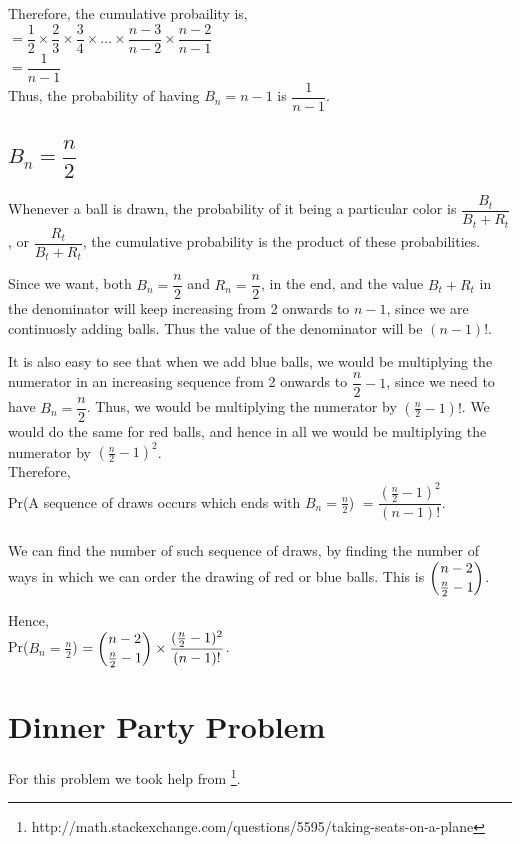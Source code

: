 \documentclass{article}
\begin{document}
Therefore, the cumulative probaility is, \\
$= \dfrac{1}{2} \times \dfrac{2}{3} \times \dfrac{3}{4} \times ... \times \dfrac{n-3}{n-2} \times \dfrac{n-2}{n-1}$ \\
$= \dfrac{1}{n-1}$ \\
Thus, the probability of having $B_{n} = n-1$ is $\dfrac{1}{n-1}$.
\subsection{$B_{n} = \dfrac{n}{2}$}
Whenever a ball is drawn, the probability of it being a 
particular color is $\dfrac{B_{t}}{B_{t} + R_{t}}$, or
$\dfrac{R_{t}}{B_{t}+R_{t}}$, the cumulative probability
is the product of these probabilities.

Since we want, both $B_{n} = \dfrac{n}{2}$ and 
$R_{n} = \dfrac{n}{2}$, in the end, and the value 
$B_{t}+R_{t}$ in the denominator will keep increasing
from 2 onwards to $n-1$, since we are continuosly adding
balls. Thus the value of the denominator will be $(n-1)!$.

It is also easy to see that when we add blue balls, we
would be multiplying the numerator in an increasing 
sequence from 2 onwards to $\dfrac{n}{2}-1$, since we
need to have $B_{n} = \dfrac{n}{2}$. Thus, we would
be multiplying the numerator by $(\frac{n}{2}-1)!$.
We would do the same for red balls, and hence in all
we would be multiplying the numerator by 
$(\frac{n}{2}-1)^2$. \\

Therefore,\\
Pr(A sequence of draws occurs which ends with $B_{n} = \frac{n}{2}$) $ = \dfrac{(\frac{n}{2}-1)^2}{(n-1)!} $.
\\
\\
We can find the number of such sequence of draws, by
finding the number of ways in which we can order the
drawing of red or blue balls. This is $\dbinom{n-2}{\frac{n}{2}-1}$.

Hence, \\
Pr($B_n = \frac{n}{2}$) $ = 
\dbinom{n-2}{\frac{n}{2}-1} \times
\dfrac{(\frac{n}{2}-1)^2}{(n-1)!}$.  
\clearpage

\section{Dinner Party Problem}
For this problem we took help from 
\footnote{http://math.stackexchange.com/questions/5595/taking-seats-on-a-plane}.
\end{document}
